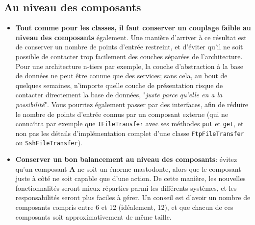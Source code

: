 \documentclass[11pt]{amsbook}
\begin{document}
\hypertarget{x-au-niveau-des-composants}{\subsection{Au niveau des composants}}
\begin{itemize}

\item \textbf{Tout comme pour les classes, il faut conserver un couplage faible au niveau des composants} également. Une manière d’arriver à ce résultat est de conserver un nombre de points d’entrée restreint, et d’éviter qu’il ne soit possible de contacter trop facilement des couches séparées de l’architecture. Pour une architecture n-tiers par exemple, la couche d’abstraction à la base de données ne peut être connue que des services; sans cela, au bout de quelques semaines, n’importe quelle couche de présentation risque de contacter directement la base de données, "\emph{juste parce qu’elle en a la possibilité}". Vous pourriez également passer par des interfaces, afin de réduire le nombre de points d’entrée connus par un composant externe (qui ne connaîtra par exemple que \texttt{IFileTransfer} avec ses méthodes \texttt{put} et \texttt{get}, et non pas les détails d’implémentation complet d’une classe \texttt{FtpFileTransfer} ou \texttt{SshFileTransfer}).

\item \textbf{Conserver un bon balancement au niveau des composants}: évitez qu’un composant \textbf{A} ne soit un énorme mastodonte, alors que le composant juste à côté ne soit capable que d’une action. De cette manière, les nouvelles fonctionnalités seront mieux réparties parmi les différents systèmes, et les responsabilités seront plus faciles à gérer. Un conseil est d’avoir un nombre de composants compris entre 6 et 12 (idéalement, 12), et que chacun de ces composants soit approximativement de même taille.

\end{itemize}
\end{document}

